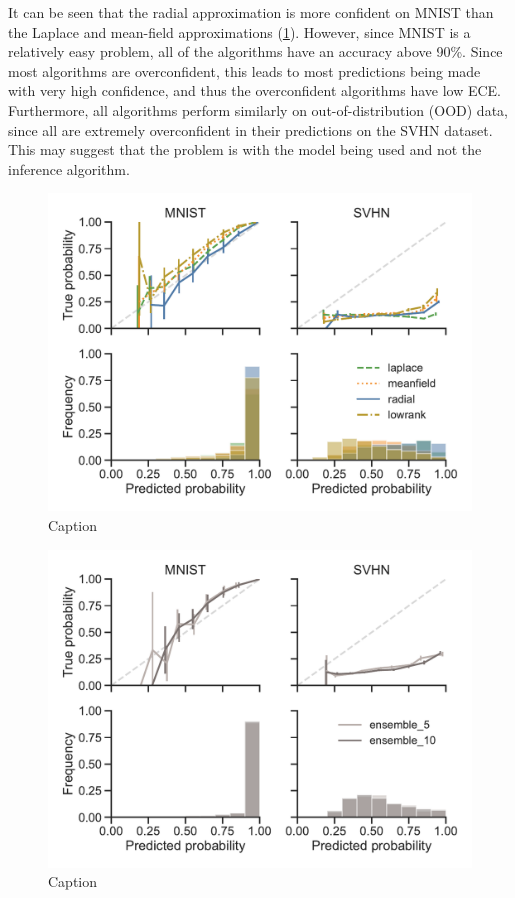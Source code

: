 \documentclass[10pt,a4paper,twocolumn]{article}
\begin{document}
It can be seen that the radial approximation is more confident on MNIST than the Laplace and mean-field approximations (\cref{fig:cross-calibration}).
However, since MNIST is a relatively easy problem, all of the algorithms have an accuracy above 90\%.
Since most algorithms are overconfident, this leads to most predictions being made with very high confidence, and thus the overconfident algorithms have low ECE.
Furthermore, all algorithms perform similarly on out-of-distribution (OOD) data, since all are extremely overconfident in their predictions on the SVHN dataset.
This may suggest that the problem is with the model being used and not the inference algorithm.
%
\begin{figure}
    \centering
    \includegraphics[width=\linewidth]{figures/MnistVI.pdf}
    \caption{Caption}
    \label{fig:cross-calibration}
\end{figure}
\begin{figure}
    \centering
    \includegraphics[width=\linewidth]{figures/MnistEnsembles.pdf}
    \caption{Caption}
    \label{fig:cross-calibration-ensemble}
\end{figure}
\end{document}
